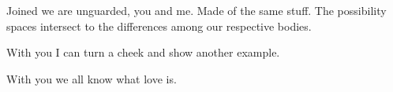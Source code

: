 

Joined we are unguarded, you and me.  Made of the same stuff.  The
possibility spaces intersect to the differences among our respective
bodies.  

With you I can turn a cheek and show another example.

With you we all know what love is.

\bye
